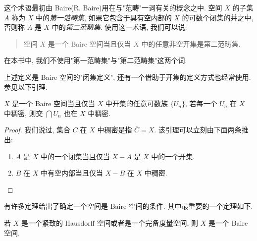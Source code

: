 \begin{remark}
这个术语最初由 Baire(R. Baire)用在与"范畴"一词有关的概念之中. 空间 $X$ 的子集 $A$ 称为 $X$ 中的\emph{第一范畴集}, 如果它包含于具有空内部的 $X$ 的可数个闭集的并之中, 否则称 $A$ 是 $X$ 中的\emph{第二范畴集}. 使用这一术语, 我们可以说:
\begin{quote}
空间 $X$ 是一个 Baire 空间当且仅当 $X$ 中的任意非空开集是第二范畴集.
\end{quote}
在本书中, 我们不使用"第一范畴集"与"第二范畴集"这两个词.

上述定义是 Baire 空间的"闭集定义", 还有一个借助于开集的定义方式也经常使用. 参见以下引理.
\end{remark}

\begin{lemma}[开集形式]
\label{lemma:ch08-sec48-48-1}
$X$ 是一个 Baire 空间当且仅当 $X$ 中开集的任意可数族 $\{U_n\}$, 若每一个 $U_n$ 在 $X$ 中稠密, 则交 $\bigcap U_n$ 也在 $X$ 中稠密.
\end{lemma}

\begin{proof}
我们说过, 集合 $C$ 在 $X$ 中稠密是指 $\overline{C}=X$. 该引理可以立刻由下面两条推出:
\begin{enumerate}
\item $A$ 是 $X$ 中的一个闭集当且仅当 $X-A$ 是 $X$ 中的一个开集.
\item $B$ 在 $X$ 中有空内部当且仅当 $X-B$ 在 $X$ 中稠密.
\end{enumerate}
\end{proof}

有许多定理给出了确定一个空间是 Baire 空间的条件. 其中最重要的一个定理如下.

\begin{theorem}[Baire范畴定理]
\label{theorem:ch08-sec48-48-2}
若 $X$ 是一个紧致的 Hausdorff 空间或者是一个完备度量空间, 则 $X$ 是一个 Baire 空间.
\end{theorem}

